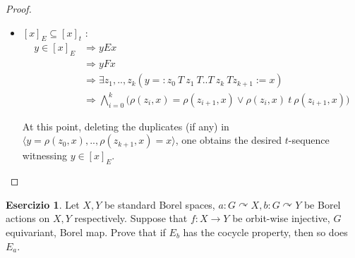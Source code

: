 \documentclass[a4paper,12pt]{article}
\theoremstyle{plain}
\theoremstyle{definition}
\newtheorem{esercizio}{Esercizio}
\theoremstyle{remark}
\begin{document}
\begin{proof}
\begin{itemize}
\begin{itemize}
				\item $[x]_E \subseteq [x]_t$ : \\
					\begin{align*}
						y \in [x]_E & \Rightarrow y E x  \\
							& \Rightarrow y F x      \\
							& \Rightarrow \exists z_1,..,z_k (y =: z_0 \ T \ z_1 \ T .. T \ z_k \ T z_{k+1} := x) \\
							& \Rightarrow \bigwedge_{i=0}^{k} \bigg(\rho(z_i,x) = 
									\rho(z_{i+1},x) \lor \rho(z_i,x) \ t \ \rho(z_{i+1},x) \bigg)
					\end{align*}

					At this point, deleting the duplicates (if any) in 
					$\langle y = \rho(z_0,x),.., \rho(z_{k+1},x) = x \rangle $,
					one obtains the desired $t$-sequence witnessing $y \in [x]_E$.
			\end{itemize}
	\end{itemize}

\end{proof}





\begin{esercizio}
	Let $X,Y$ be standard Borel spaces, $a:G \curvearrowright X , b:G \curvearrowright Y $ be Borel actions on $X,Y$ respectively.
	Suppose that $f:X \to Y$ be orbit-wise injective, $G$ equivariant, Borel map.
	Prove that if $E_b$ has the cocycle property, then so does $E_a$.
\end{esercizio}
\end{document}
